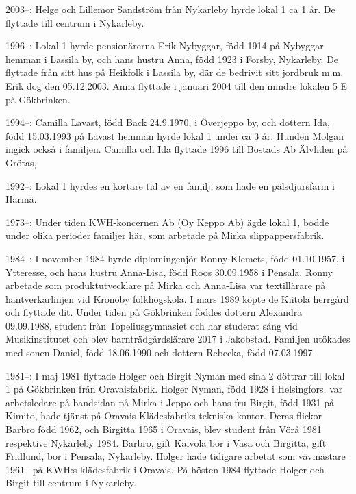 2003--: Helge och Lillemor Sandström från Nykarleby hyrde lokal 1 ca 1 år. De flyttade till centrum i Nykarleby.

1996--: Lokal 1 hyrde pensionärerna Erik Nybyggar, född 1914 på Nybyggar hemman i Lassila by, och hans hustru Anna, född 1923 i Forsby, Nykarleby. De flyttade från sitt hus på Heikfolk i Lassila by, där de bedrivit sitt jordbruk m.m.  Erik dog den 05.12.2003. Anna flyttade i januari 2004 till den mindre lokalen 5 E på Gökbrinken.

1994--: Camilla Lavast, född Back 24.9.1970, i Överjeppo by, och dottern Ida, född 15.03.1993 på Lavast hemman hyrde lokal 1 under ca 3 år. Hunden Molgan ingick också i familjen. Camilla och Ida flyttade 1996 till Bostads Ab Älvliden på Grötas,

1992--: Lokal 1 hyrdes en kortare tid av en familj, som hade en pälsdjursfarm i Härmä.


 1973--:
Under tiden KWH-koncernen Ab (Oy Keppo Ab) ägde lokal 1, bodde under olika perioder familjer här, som arbetade på Mirka slippappersfabrik.

1984--: I november 1984 hyrde diplomingenjör Ronny Klemets, född 01.10.1957, i Ytteresse, och hans hustru Anna-Lisa, född Roos 30.09.1958 i Pensala. Ronny arbetade som produktutvecklare på Mirka och Anna-Lisa var textillärare på hantverkarlinjen vid Kronoby folkhögskola. I mars 1989 köpte de Kiitola herrgård och flyttade dit. Under tiden på Gökbrinken föddes dottern Alexandra 09.09.1988, student från Topeliusgymnasiet och har studerat sång vid Musikinstitutet och blev barnträdgårdslärare 2017 i Jakobstad. Familjen utökades med sonen Daniel, född 18.06.1990 och dottern Rebecka, född  07.03.1997.

1981--: I maj 1981 flyttade Holger och Birgit Nyman med sina 2 döttrar till lokal 1 på Gökbrinken från Oravaisfabrik. Holger Nyman, född 1928 i Helsingfors, var arbetsledare på bandsidan på Mirka i Jeppo och hans fru Birgit, född 1931 på Kimito, hade tjänst på Oravais Klädesfabriks tekniska kontor. Deras flickor Barbro född 1962, och Birgitta 1965 i Oravais, blev student från Vörå 1981 respektive Nykarleby 1984. Barbro, gift Kaivola bor i Vasa och Birgitta, gift Fridlund, bor i Pensala, Nykarleby. Holger hade tidigare arbetat som vävmästare 1961-- på KWH:s klädesfabrik i Oravais. På hösten 1984 flyttade Holger och Birgit till centrum i Nykarleby.

